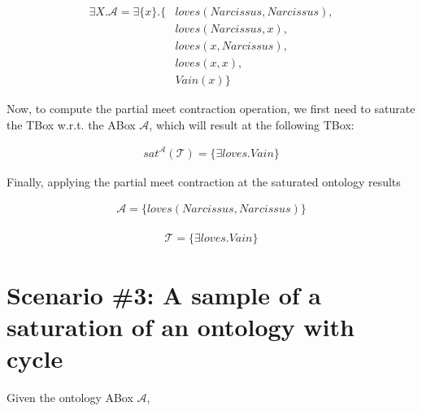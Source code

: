 \begin{equation*}
    \begin{aligned}
        \exists X.\mathcal{A} = \exists \{ x \}.\{ & loves(Narcissus, Narcissus),  \\
                                                   & loves(Narcissus, x),          \\
                                                   & loves(x, Narcissus),          \\
                                                   & loves(x, x),                  \\ 
                                                   & Vain(x) \}
    \end{aligned}
\end{equation*}

Now, to compute the partial meet contraction operation, we first need to saturate the TBox w.r.t. the ABox $\mathcal{A}$, which will result at the following TBox:

\begin{equation*}
    \begin{aligned}
        sat^{\mathcal{A}}(\mathcal{T}) = \{ \exists loves.Vain \}
    \end{aligned}
\end{equation*}

Finally, applying the partial meet contraction at the saturated ontology results

\begin{equation*}
    \begin{aligned}
        \mathcal{A} = \{ loves(Narcissus, Narcissus) \}
    \end{aligned}
\end{equation*}

\begin{equation*}
    \begin{aligned}
        \mathcal{T} = \{ \exists loves.Vain \}
    \end{aligned}
\end{equation*}

\section{Scenario \#3: A sample of a saturation of an ontology with cycle}
\label{sec:scenario-3}

Given the ontology ABox $\mathcal{A}$,

